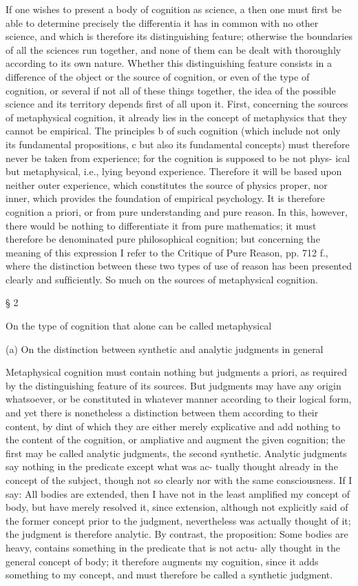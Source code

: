 If one wishes to present a body of cognition as science, a then one must ﬁrst
be able to determine precisely the differentia it has in common with no
other science, and which is therefore its distinguishing feature; otherwise
the boundaries of all the sciences run together, and none of them can be
dealt with thoroughly according to its own nature.
Whether this distinguishing feature consists in a difference of the
object or the source of cognition, or even of the type of cognition, or several
if not all of these things together, the idea of the possible science and its
territory depends ﬁrst of all upon it.
First, concerning the sources of metaphysical cognition, it already
lies in the concept of metaphysics that they cannot be empirical. The
principles b of such cognition (which include not only its fundamental
propositions, c but also its fundamental concepts) must therefore never
be taken from experience; for the cognition is supposed to be not phys-
ical but metaphysical, i.e., lying beyond experience. Therefore it will
be based upon neither outer experience, which constitutes the source
of physics proper, nor inner, which provides the foundation of empirical
psychology. It is therefore cognition a priori, or from pure understanding
and pure reason.
In this, however, there would be nothing
to differentiate it from pure mathematics;
it must therefore be denominated pure philosophical cognition;
but concerning the meaning of this expression
I refer to the Critique of Pure Reason, pp. 712 f.,
where the distinction between these
two types of use of reason has been presented clearly and sufﬁciently.
So much on the sources of metaphysical cognition.

§ 2

On the type of cognition that alone can be called metaphysical

(a) On the distinction between synthetic and analytic judgments in general

Metaphysical cognition must contain nothing
but judgments a priori, as required by
the distinguishing feature of its sources.
But judgments may have any origin whatsoever,
or be constituted in whatever manner
according to their logical form,
and yet there is nonetheless a distinction
between them according to their content,
by dint of which they are
either merely explicative and add nothing
to the content of the cognition,
or ampliative and augment the given cognition;
the ﬁrst may be called analytic judgments,
the second synthetic.
Analytic judgments say nothing in the predicate except what was ac-
tually thought already in the concept of the subject, though not so clearly
nor with the same consciousness. If I say: All bodies are extended, then
I have not in the least ampliﬁed my concept of body, but have merely
resolved it, since extension, although not explicitly said of the former
concept prior to the judgment, nevertheless was actually thought of it;
the judgment is therefore analytic. By contrast, the proposition: Some
bodies are heavy, contains something in the predicate that is not actu-
ally thought in the general concept of body; it therefore augments my
cognition, since it adds something to my concept, and must therefore be
called a synthetic judgment.

